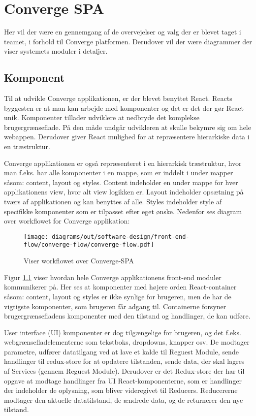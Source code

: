 \chapter{Converge SPA}
Her vil der være en gennemgang af de overvejelser og valg der er blevet taget i teamet, i forhold til Converge platformen. Derudover vil der være diagrammer der viser systemets moduler i detaljer. 

\section{Komponent}
Til at udvikle Converge applikationen, er der blevet benyttet React.  Reacts byggesten er at man kan arbejde med komponenter og det er det der gør React unik. Komponenter tillader udviklere at nedbryde det komplekse brugergrænseflade. På den måde undgår udvikleren at skulle bekymre sig om hele webappen. Derudover giver React mulighed for at repræsentere hierarkiske data i en træstruktur.

Converge applikationen er også repræsenteret i en hierarkisk træstruktur, hvor man f.eks. har alle komponenter i en mappe, som er inddelt i under mapper såsom: content, layout og styles. Content indeholder en under mappe for hver applikationens view, hvor alt view logikken er. Layout indeholder opsætning på tværs af applikationen og kan benyttes af alle. Styles indeholder style af specifikke komponenter som er tilpasset efter eget ønske.  
Nedenfor ses diagram over workflowet for Converge applikation:

\begin{figure}[H]
    \centering
\texttt{[image: diagrams/out/software-design/front-end-flow/converge-flow/converge-flow.pdf]}
\caption{Viser workflowet over Converge-SPA}
\label{fig:workflow}
\end{figure}


Figur \ref{fig:workflow} viser hvordan hele Converge applikationens front-end moduler kommunikerer på. Her ses at komponenter med højere orden React-container såsom: content, layout og styles er ikke synlige for brugeren, men de har de vigtigste komponenter, som brugeren får adgang til. Containerne forsyner brugergrænsefladens komponenter med den tilstand og handlinger, de kan udføre. 

User interface (UI) komponenter er dog tilgængelige for brugeren, og det f.eks. webgrænsefladelementerne som tekstboks, dropdowns, knapper osv. De modtager parametre, udfører datatilgang ved at lave et kalde til Reguest Module, sende handlinger til redux-store for at opdatere tilstanden, sende data, der skal lagres af Services (gennem Reguest Module). 
Derudover er det Redux-store der har til opgave at modtage handlinger fra UI React-komponenterne, som er handlinger der indeholder de oplysning, som bliver videregivet til Reducers. Reducererne modtager den aktuelle datatilstand, de ændrede data, og de returnerer den nye tilstand. 

